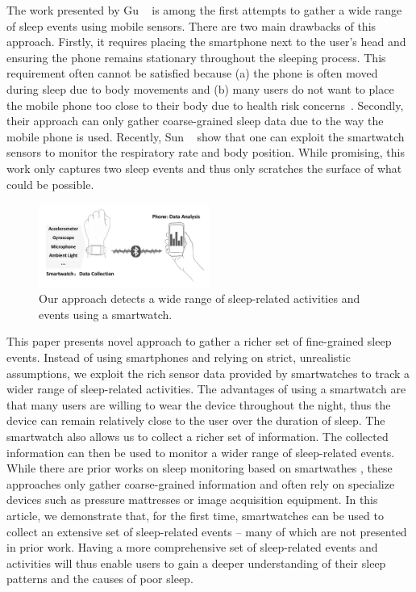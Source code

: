 The work presented by Gu \etal~\cite{gu2016sleep} is among the first attempts to gather  a wide range of sleep events using mobile sensors.
There are two main drawbacks of this approach. Firstly, it requires placing the smartphone next to the user's head and ensuring the phone
remains stationary throughout the sleeping process. This requirement often cannot be satisfied because (a) the phone is often moved during
sleep due to body movements and (b) many users do not want to place the mobile phone too close to their body due to health risk
concerns~\cite{StepHealth,Quorasleep}.  Secondly, their approach can only gather coarse-grained sleep data due to the way the mobile phone
is used. Recently, Sun \etal~\cite{sleepmonitor} show that one can exploit the smartwatch sensors to monitor the respiratory  rate and body
position. While promising, this work only captures two sleep events and thus only scratches the surface of what could be possible.


\begin{figure}[!t]
\centering
\setlength{\belowcaptionskip}{-13pt}
      \includegraphics[width=0.5\textwidth]{Figures/datacollect.pdf}
  \caption{Our approach detects a wide range of sleep-related activities and events using a smartwatch.}\label{fig:datacollect}
\end{figure}

This paper presents novel approach to gather a richer set of fine-grained sleep events. Instead of using smartphones and relying on strict,
unrealistic assumptions, we exploit the rich sensor data provided by smartwatches to track a wider range of sleep-related activities. The
advantages of using a smartwatch are that many users are willing to wear the device throughout the night, thus the device can remain
relatively close to the user over the duration of sleep. The smartwatch also allows us to collect a richer set of information. The
collected information can then be used to monitor a wider range of sleep-related events. While there are prior works on sleep monitoring
based on smartwathes \cite{pombo2016ubisleep,shelgikar2016sleep,haescher2015anomaly,borazio2012combining}, these approaches only gather
coarse-grained information and often rely on specialize devices such as pressure mattresses or image acquisition equipment. In this
article, we demonstrate that, for the first time, smartwatches can be used to collect an extensive set of sleep-related events -- many of
which are not presented in prior work. Having a more comprehensive set of sleep-related events and activities will thus enable users to
gain a deeper understanding of their sleep patterns and the causes of poor sleep.

